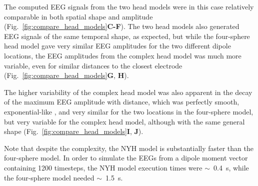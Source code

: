 \documentclass[preprint,10pt,authoryear]{elsarticle}
\begin{document}
The computed EEG signals from the two head models were in this case relatively comparable in both spatial shape and amplitude (Fig.~\ref{fig:compare_head_models}\textbf{C-F}). The two head models also generated EEG signals of the same temporal shape, as expected, but while the four-sphere head model gave very similar EEG amplitudes for the two different dipole locations, the EEG amplitudes from the complex head model was much more variable, even for similar distances to the closest electrode (Fig.~\ref{fig:compare_head_models}{\bf G}, {\bf H}).

The higher variability of the complex head model was also apparent in the decay of the maximum EEG amplitude with distance, which was perfectly smooth, exponential-like \citep{NUNEZ2006}, and very similar for the two locations in the four-sphere model, but very variable for the complex head model, although with the same general shape (Fig.~\ref{fig:compare_head_models}{\bf I}, {\bf J}). 

Note that despite the complexity, the NYH model is substantially faster than the four-sphere model. In order to simulate the EEGs from a dipole moment vector containing 1200 timesteps, the NYH model execution times were $\sim$~0.4~s, while the four-sphere model needed $\sim$~1.5~s.
\end{document}
